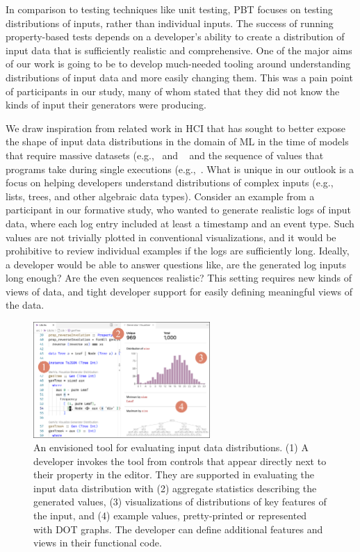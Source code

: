 In comparison to testing techniques like unit testing, PBT focuses on testing
distributions of inputs, rather than individual inputs. The success of running
property-based tests depends on a developer's ability to create a distribution
of input data that is sufficiently realistic and comprehensive. One of the major
aims of our work is going to be to develop much-needed tooling around
understanding distributions of input data and more easily changing them. This
was a pain point of participants in our study, many of whom stated that they did
not know the kinds of input their generators were producing.

We draw inspiration from related work in HCI that has sought to better expose
the shape of input data distributions in the domain of ML in the time of models
that require massive datasets (e.g.,~\cite{ref:hohman2019gamut} and
~\cite{ref:hohman2020understanding} and the sequence of values that programs
take during single executions (e.g.,~\cite{ref:kang2017omnicode}. What is unique
in our outlook is a focus on helping developers understand distributions of
complex inputs (e.g., lists, trees, and other algebraic data types). Consider an
example from a participant in our formative study, who wanted to generate
realistic logs of input data, where each log entry included at least a timestamp
and an event type. Such values are not trivially plotted in conventional
visualizations, and it would be prohibitive to review individual examples if the
logs are sufficiently long. Ideally, a developer would be able to answer
questions like, are the generated log inputs long enough? Are the even sequences
realistic?  This setting requires new kinds of views of data, and tight
developer support for easily defining meaningful views of the data.

\begin{figure}
  \centering
  \includegraphics[width=0.6\textwidth]{assets/gen-vis.pdf}
  \caption{An envisioned tool for evaluating input data distributions.
  (1) A developer invokes the tool from controls that appear directly
  next to their property in the editor. They are supported in evaluating the
  input data distribution with (2) aggregate statistics describing the generated
  values, (3) visualizations of distributions of key features of the input, and (4)
  example values, pretty-printed or represented with DOT graphs. The developer can define additional
  features and views in their functional code.}\label{fig:gen-vis}
\end{figure}

